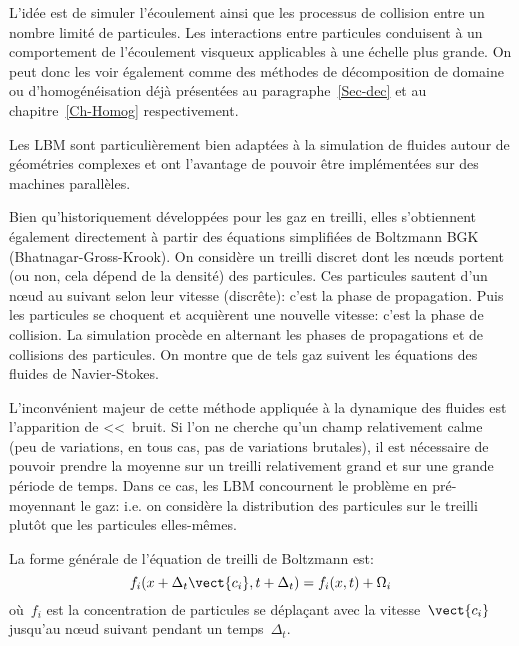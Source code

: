 L'idée est de simuler l'écoulement ainsi que les processus de collision entre un nombre limité de 
particules. Les interactions entre particules conduisent à un comportement de l'écoulement 
visqueux applicables à une échelle plus grande. 
On peut donc les voir également comme des méthodes de décomposition de domaine ou
d'homogénéisation déjà présentées au paragraphe~\ref{Sec-dec} et au chapitre~\ref{Ch-Homog}
respectivement.


\medskip
Les LBM sont particulièrement bien adaptées à la simulation de fluides autour de géométries
complexes et ont l'avantage de pouvoir être implémentées sur des machines parallèles.

Bien qu'historiquement développées pour les gaz en treilli, elles s'obtiennent également directement
à partir des équations simplifiées de Boltzmann BGK (Bhatnagar-Gross-Krook).
On considère un treilli discret dont les nœuds portent (ou non, cela dépend de la
densité) des particules.
Ces particules sautent d'un nœud au suivant selon leur vitesse (discrête): c'est la
phase de propagation.
Puis les particules se choquent et acquièrent une nouvelle vitesse: c'est la phase de collision.
La simulation procède en alternant les phases de propagations et de collisions des particules. 
On montre que de tels gaz suivent les équations des fluides de Navier-Stokes.

L'inconvénient majeur de cette méthode appliquée à la dynamique des fluides est l'apparition 
de <<~bruit\fg.
Si l'on ne cherche qu'un champ relativement calme (peu de variations, en tous cas, pas de variations brutales),
il est nécessaire de pouvoir prendre la moyenne sur un treilli relativement grand et sur une grande
période de temps.
Dans ce cas, les LBM concournent le problème en pré-moyennant le gaz: i.e. on considère
la distribution des particules sur le treilli plutôt que les particules elles-mêmes.

\medskip
La forme générale de l'équation de treilli de Boltzmann est:
\begin{equation} f_i(x+\Delta_t \vect{c_i}, t+\Delta_t) = f_i(x,t) + \Omega_i \end{equation}
où~$f_i$ est la concentration de particules se déplaçant avec la vitesse~$\vect{c_i}$ jusqu'au nœud suivant
pendant un temps~$\Delta_t$.

